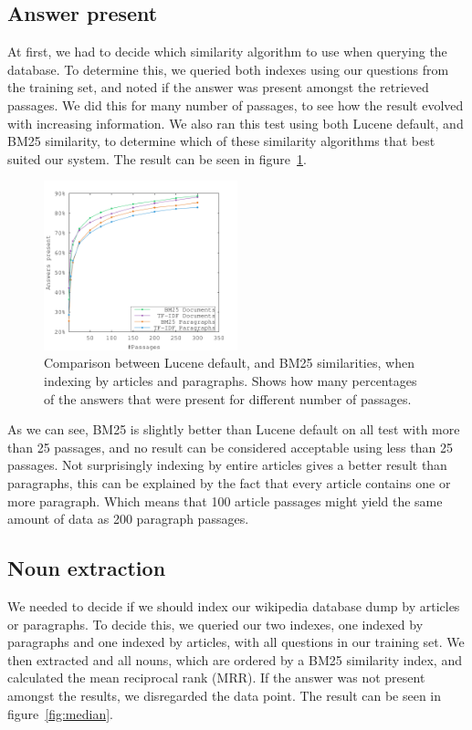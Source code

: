 \subsection{Answer present}
At first, we had to decide which similarity algorithm to use when querying the database. 
To determine this, we queried both indexes using our questions from the training set, and noted if the answer was present amongst the retrieved passages. 
We did this for many number of passages, to see how the result evolved with increasing information.
We also ran this test using both Lucene default, and BM25 similarity, to determine which of these similarity algorithms that best suited our system.
The result can be seen in figure~\ref{fig:bm25_tfdf}.

\begin{figure}[h!]
  \centering
  \includegraphics[width=0.5\textwidth]{figures/bm25_tfdf.pdf}
  \caption{Comparison between Lucene default, and BM25 similarities, when indexing by articles and paragraphs. 
  Shows how many percentages of the answers that were present for different number of passages.}
  \label{fig:bm25_tfdf}
\end{figure}

As we can see, BM25 is slightly better than Lucene default on all test with more than 25 passages, and no result can be 
considered acceptable using less than 25 passages.
Not surprisingly indexing by entire articles gives a better result than paragraphs, 
this can be explained by the fact that every article contains one or more paragraph. 
Which means that 100 article passages might yield the same amount of data as 200 paragraph passages.

\subsection{Noun extraction}

We needed to decide if we should index our wikipedia database dump by articles or paragraphs.
To decide this, we queried our two indexes, one indexed by paragraphs and
one indexed by articles, with all questions in our training set. We then extracted and 
all nouns, which are ordered by a BM25 similarity index, and calculated the mean reciprocal rank (MRR). \cite{mrr}
If the answer was not present amongst the results, we disregarded the data point.
The result can be seen in figure~\ref{fig:median}.

